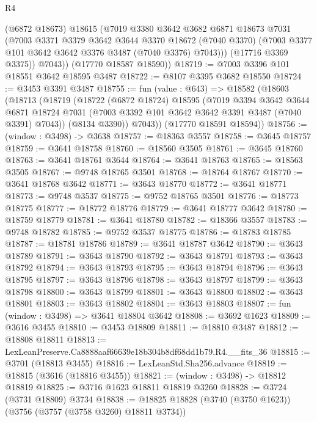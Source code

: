 \begin{lexlean}{R4}
\begin{coremodule}
            (@6872 @18673)
            @18615
            (@7019
              @3380
              @3642
              @3682
              @6871
              @18673
              @7031
              (@7003
                @3371
                @3379
                @3642
                @3644
                @3370
                @18672
                (@7040 @3370)
                (@7003 @3377 @101 @3642 @3642 @3376 @3487 (@7040 @3376) @7043)))
            (@17716 @3369 @3375))
          @7043))
      (@17770 @18587 @18590))
@18719 := @7003 @3396 @101 @18551 @3642 @18595 @3487
@18722 := @8107 @3395 @3682 @18550
@18724 := @3453 @3391 @3487
@18755 := fun (value : @643) =>
  @18582
    (@18603
      (@18713
        (@18719
          (@18722
            (@6872 @18724)
            @18595
            (@7019
              @3394
              @3642
              @3644
              @6871
              @18724
              @7031
              (@7003 @3392 @101 @3642 @3642 @3391 @3487 (@7040 @3391) @7043))
            (@8134 @3390))
          @7043))
      (@17770 @18591 @18594))
@18756 := (window : @3498) -> @3638
@18757 := @18363 @3557
@18758 := @3645 @18757
@18759 := @3641 @18758
@18760 := @18560 @3505
@18761 := @3645 @18760
@18763 := @3641 @18761 @3644
@18764 := @3641 @18763
@18765 := @18563 @3505
@18767 := @9748 @18765 @3501
@18768 := @18764 @18767
@18770 := @3641 @18768 @3642
@18771 := @3643 @18770
@18772 := @3641 @18771
@18773 := @9748 @3537
@18775 := @9752 @18765 @3501
@18776 := @18773 @18775
@18777 := @18772 @18776
@18779 := @3641 @18777 @3642
@18780 := @18759 @18779
@18781 := @3641 @18780
@18782 := @18366 @3557
@18783 := @9748 @18782
@18785 := @9752 @3537 @18775
@18786 := @18783 @18785
@18787 := @18781 @18786
@18789 := @3641 @18787 @3642
@18790 := @3643 @18789
@18791 := @3643 @18790
@18792 := @3643 @18791
@18793 := @3643 @18792
@18794 := @3643 @18793
@18795 := @3643 @18794
@18796 := @3643 @18795
@18797 := @3643 @18796
@18798 := @3643 @18797
@18799 := @3643 @18798
@18800 := @3643 @18799
@18801 := @3643 @18800
@18802 := @3643 @18801
@18803 := @3643 @18802
@18804 := @3643 @18803
@18807 := fun (window : @3498) => @3641 @18804 @3642
@18808 := @3692 @1623
@18809 := @3616 @3455
@18810 := @3453 @18809
@18811 := @18810 @3487
@18812 := @18808 @18811
@18813 := LexLeanPreserve.Ca8888aaf66639e18b304b8df68dd1b79.R4.__fits_36
@18815 := @3701 (@18813 @3455)
@18816 := LexLeanStd.Sha256.advance
@18819 := @18815 (@3616 (@18816 @3455))
@18821 := (window : @3498) -> @18812 @18819
@18825 := @3716 @1623 @18811 @18819 @3260
@18828 := @3724 (@3731 @18809) @3734
@18838 := @18825 @18828 (@3740 (@3750 @1623)) (@3756 (@3757 (@3758 @3260) @18811 @3734))

\end{coremodule}
\end{lexlean}
